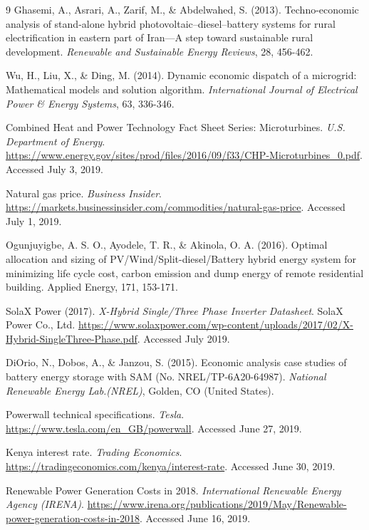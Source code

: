\documentclass[final,3p,times]{elsarticle}
\begin{document}
\begin{thebibliography}{9}
Ghasemi, A., Asrari, A., Zarif, M., \& Abdelwahed, S. (2013). Techno-economic analysis of stand-alone hybrid photovoltaic–diesel–battery systems for rural electrification in eastern part of Iran—A step toward sustainable rural development. \textit{Renewable and Sustainable Energy Reviews}, 28, 456-462.

Wu, H., Liu, X., \& Ding, M. (2014). Dynamic economic dispatch of a microgrid: Mathematical models and solution algorithm. \textit{International Journal of Electrical Power \& Energy Systems}, 63, 336-346.

Combined Heat and Power Technology Fact Sheet Series: Microturbines. \textit{U.S. Department of Energy}. \url{https://www.energy.gov/sites/prod/files/2016/09/f33/CHP-Microturbines_0.pdf}. Accessed July 3, 2019.

Natural gas price. \textit{Business Insider}. \url{https://markets.businessinsider.com/commodities/natural-gas-price}. Accessed July 1, 2019.

Ogunjuyigbe, A. S. O., Ayodele, T. R., \& Akinola, O. A. (2016). Optimal allocation and sizing of PV/Wind/Split-diesel/Battery hybrid energy system for minimizing life cycle cost, carbon emission and dump energy of remote residential building. Applied Energy, 171, 153-171.

SolaX Power (2017). \textit{X-Hybrid Single/Three Phase Inverter Datasheet}. SolaX Power Co., Ltd. \url{https://www.solaxpower.com/wp-content/uploads/2017/02/X-Hybrid-SingleThree-Phase.pdf}. Accessed July 2019.

DiOrio, N., Dobos, A., \& Janzou, S. (2015). Economic analysis case studies of battery energy storage with SAM (No. NREL/TP-6A20-64987). \textit{National Renewable Energy Lab.(NREL)}, Golden, CO (United States).

Powerwall technical specifications. \textit{Tesla}. \url{https://www.tesla.com/en_GB/powerwall}. Accessed June 27, 2019.

Kenya interest rate. \textit{Trading Economics}. \url{https://tradingeconomics.com/kenya/interest-rate}. Accessed June 30, 2019.

Renewable Power Generation Costs in 2018. \textit{International Renewable Energy Agency (IRENA)}. \url{https://www.irena.org/publications/2019/May/Renewable-power-generation-costs-in-2018}. Accessed June 16, 2019.


\end{thebibliography}
\end{document}
